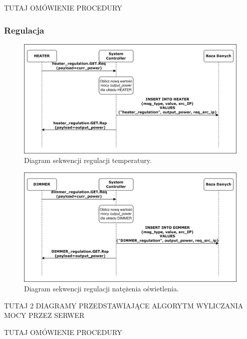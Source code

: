             TUTAJ OMÓWIENIE PROCEDURY

        \subsubsection{Regulacja}

            \begin{figure}[H]
                \centering
                \includegraphics[width=0.8\linewidth]{graphics/sequence-diagrams/heater-regulate-seq.png}
                \caption{Diagram sekwencji regulacji temperatury.}
                \label{fig:seq-heater-mregulate-db}
            \end{figure}

            \begin{figure}[H]
                \centering
                \includegraphics[width=0.8\linewidth]{graphics/sequence-diagrams/dimmer-regulate-seq.png}
                \caption{Diagram sekwencji regulacji natężenia oświetlenia.}
                \label{fig:seq-dimmer-regulate-db}
            \end{figure}

            TUTAJ 2 DIAGRAMY PRZEDSTAWIAJĄCE ALGORYTM WYLICZANIA MOCY PRZEZ SERWER

            TUTAJ OMÓWIENIE PROCEDURY
